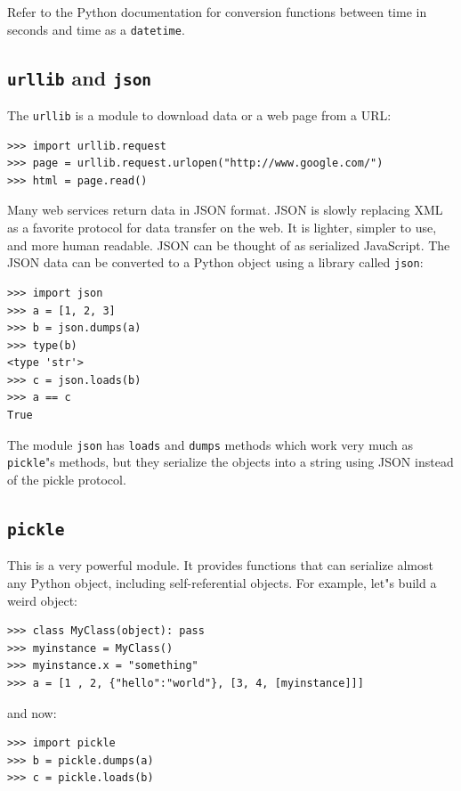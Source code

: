\documentclass[justified, sixbynine]{tufte-book}
\def\ft{\small\tt}
\theoremstyle{plain}%
\newtheorem * {corollary}{Corollary}
\theoremstyle{definition}
\theoremstyle{remark}
\newtheorem * {remark}{Remark}
\newtheorem * {note}{Note}
\begin{document}
\begin{fullwidth}
Refer to the Python documentation for conversion functions between time in seconds and time as a {\ft datetime}.

\goodbreak\subsection{{\ft urllib} and {\ft json}}


The {\ft urllib} is a module to download data or a web page from a URL:

\begin{lstlisting}
>>> import urllib.request
>>> page = urllib.request.urlopen("http://www.google.com/")
>>> html = page.read()
\end{lstlisting}

Many web services return data in JSON format. JSON is slowly replacing XML as a favorite protocol for data transfer on the web. It is lighter, simpler to use, and more human readable. JSON can be thought of as serialized JavaScript. The JSON data can be converted to a Python object using a library called {\ft json}:

\begin{lstlisting}
>>> import json
>>> a = [1, 2, 3]
>>> b = json.dumps(a)
>>> type(b)
<type 'str'>
>>> c = json.loads(b)
>>> a == c
True
\end{lstlisting}

The module {\ft json} has {\ft loads} and {\ft dumps} methods which work very much as {\ft pickle}"s methods, but they serialize the objects into a string using JSON instead of the pickle protocol.

\goodbreak\subsection{{\ft pickle}}


This is a very powerful module. It provides functions that can serialize almost any Python object, including self-referential objects. For example, let"s build a weird object:
\begin{lstlisting}
>>> class MyClass(object): pass
>>> myinstance = MyClass()
>>> myinstance.x = "something"
>>> a = [1 , 2, {"hello":"world"}, [3, 4, [myinstance]]]
\end{lstlisting}
\noindent and now:
\begin{lstlisting}
>>> import pickle
>>> b = pickle.dumps(a)
>>> c = pickle.loads(b)
\end{lstlisting}


\end{fullwidth}
\end{document}
